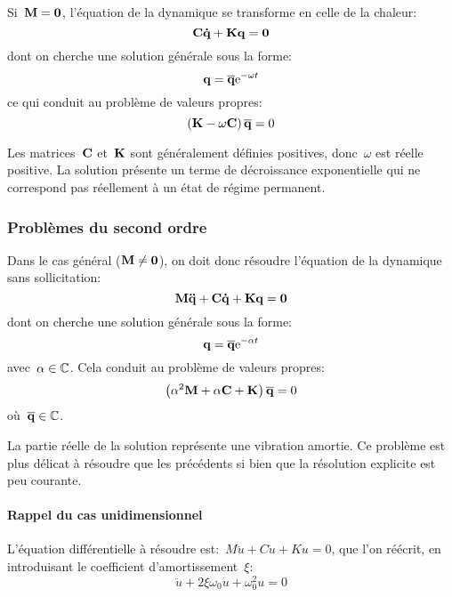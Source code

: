 Si~$\MM{M}=\MM{0}$, l'équation de la dynamique se transforme en celle de la chaleur:
\begin{equation} \MM{C}\VV{\dot{q}}+\MM{K}\VV{q}=\VV{0} \end{equation}
dont on cherche une solution générale sous la forme:
\begin{equation} \VV{q}=\VV{\overline{q}}\mathrm{e}^{-\omega t} \end{equation}
ce qui conduit au problème de valeurs propres:
\begin{equation} \left(\MM{K}-\omega\MM{C}\right)\VV{\overline{q}}=0\end{equation}

Les matrices~$\MM{C}$ et~$\MM{K}$ sont généralement définies positives, donc~$\omega$ est réelle positive. La solution présente un terme de décroissance exponentielle qui ne correspond pas réellement à un état de régime permanent.

\medskip
\subsubsection{Problèmes du second ordre}

Dans le cas général ($\MM{M}\ne\MM{0}$), on doit donc résoudre l'équation de la dynamique sans sollicitation:
\begin{equation} \MM{M}\VV{\ddot{q}}+\MM{C}\VV{\dot{q}}+\MM{K}\VV{q}=\VV{0} \end{equation}
dont on cherche une solution générale sous la forme:
\begin{equation} \VV{q}=\VV{\overline{q}}\mathrm{e}^{-\alpha t} \end{equation}
avec~$\alpha\in\mathbb C$.
Cela conduit au problème de valeurs propres:
\begin{equation} \left(\alpha^2\MM{M}+\alpha\MM{C}+\MM{K}\right)\VV{\overline{q}}=0\end{equation}
où~$\VV{\overline{q}}\in\CC$.

La partie réelle de la solution représente une vibration amortie. Ce problème est plus délicat à résoudre que les précédents si bien que la résolution explicite est peu courante.

\medskip
{}
\paragraph{Rappel du cas unidimensionnel}
L'équation différentielle à résoudre est:~$M\ddot{u}+C\dot{u}+Ku=0$, que l'on
réécrit, en introduisant le coefficient d'amortissement~$\xi$:
\begin{equation}\ddot{u}+2\xi\omega_0\dot{u}+\omega^2_0 u=0\end{equation}

